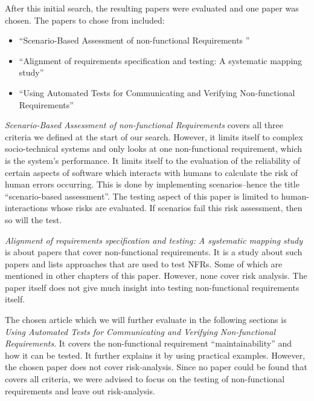 After this initial search, the resulting papers were evaluated and one paper was chosen. The papers to chose from included:

\begin{itemize}
	\item \enquote{Scenario-Based Assessment of non-functional Requirements } \cite{Andre_Search_1}
	\item \enquote{Alignment of requirements specification and testing: A systematic mapping study} \cite{Andre_Search_2}
	\item \enquote{Using Automated Tests for Communicating and Verifying Non-functional Requirements} \cite{Lagerstedt2014}
\end{itemize}


\textit{Scenario-Based Assessment of non-functional Requirements} covers all three criteria we defined at the start of our search. However, it limits itself to complex socio-technical systems and only looks at one non-functional requirement, which is the system's performance.  It limits itself to the evaluation of the reliability of certain aspects of software which interacts with humans to calculate the risk of human errors occurring.
This is done by implementing scenarios--hence the title \enquote{scenario-based assessment}. The testing aspect of this paper is limited to human-interactions whose risks are evaluated. If scenarios fail this risk assessment, then so will the test.

\textit{Alignment of requirements specification and testing: A systematic mapping study} is about papers that cover non-functional requirements. It is a study about such papers and lists approaches that are used to test \glspl{NFR}. Some of which are mentioned in other chapters of this paper. However, none cover risk analysis. The paper itself does not give much insight into testing non-functional requirements itself.

The chosen article which we will further evaluate in the following sections is \textit{Using Automated Tests for Communicating and Verifying Non-functional Requirements}. It covers the non-functional requirement \enquote{maintainability} and how it can be tested. It further explains it by using practical examples.
However, the chosen paper does not cover risk-analysis. Since no paper could be found that covers all criteria, we were advised to focus on the testing of non-functional requirements and leave out risk-analysis.




